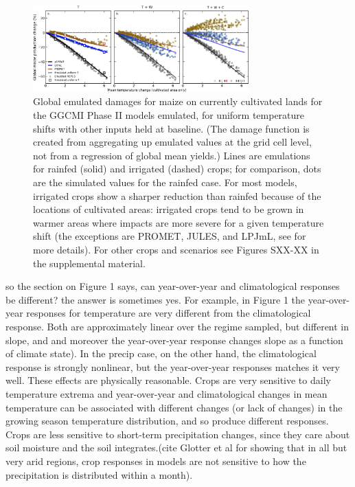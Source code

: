 \begin{figure}[ht]
    \centering
    \includegraphics[width=8.3cm]{figures/global_em_maize.png}
    \caption{Global emulated damages for maize on currently cultivated lands for the GGCMI Phase II models emulated, for uniform temperature shifts with other inputs held at baseline. 
    (The damage function is created from aggregating up emulated values at the grid cell level, not from a regression of global mean yields.) 
    Lines are emulations for rainfed (solid) and irrigated (dashed) crops; for comparison, dots are the simulated values for the rainfed case.  
    For most models, irrigated crops show a sharper reduction than rainfed because of the locations of cultivated areas: irrigated crops tend to be grown in warmer areas where impacts are more severe for a given temperature shift (the exceptions are PROMET, JULES, and LPJmL, see \citet{Franke2019a} for more details). 
    For other crops and scenarios see Figures SXX-XX in the supplemental material.}
    \label{fig:globe_em}
\end{figure}

so the section on Figure 1 says, can year-over-year and climatological responses be different? the answer is sometimes yes. For example, in 
Figure 1 the year-over-year responses for temperature are very different from the climatological response. Both are approximately linear over the regime sampled, but different in slope, and and moreover the year-over-year response changes slope as a function of climate state). 
In the precip case, on the other hand, the climatological response is strongly nonlinear, but the year-over-year responses matches it very well. 
These effects are physically reasonable. Crops are very sensitive to daily temperature extrema and year-over-year and climatological changes in mean temperature can be associated with different changes (or lack of changes) in the growing season temperature distribution, and so produce different responses. 
Crops are less sensitive to short-term precipitation changes, since they care about soil moisture and the soil integrates.(cite Glotter et al for showing that in all but very arid regions, crop responses in models are not sensitive to how the precipitation is distributed within a month).


